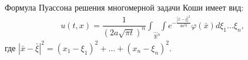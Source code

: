 \begin{theorem}\label{lec:12/the:1}
	Формула Пуассона решения многомерной задачи Коши имеет вид:
	$$\begin{gathered}
		u(t, x) = \dfrac{1}{(2a\sqrt{\pi t})^n} \underset{\mathbb{R}^n}{\overset{}{\int_{\dots}\int}} e^{-\frac{|\bar{x} - \bar{\xi}|^2}{4a^2t}}\varphi(\bar{x})d\xi_1\ldots \xi_n,
	\end{gathered}$$
	где $ |\bar{x} - \bar{\xi}|^2 = (x_1 - \xi_1)^2 + \ldots + (x_n - \xi_n)^2. $
\end{theorem}








